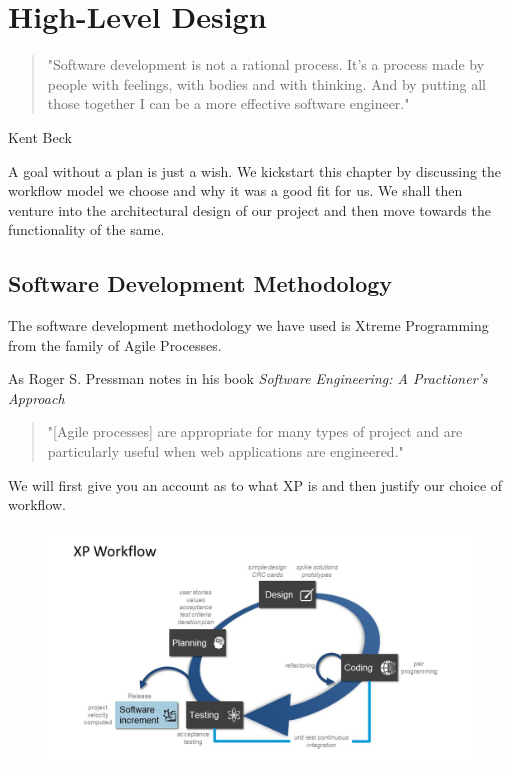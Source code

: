 \chapter{High-Level Design}

\begin{quotation}
"Software development is not a rational process. It's a process made by people with feelings,
with bodies and with thinking. And by putting all those together I can be a more effective
software engineer."
\end{quotation}
\begin{flushright}
Kent Beck
\end{flushright}

A goal without a plan is just a wish. We kickstart this chapter by discussing the workflow model we choose and why it was a good fit for us. We shall then venture into the architectural design of our project and then move towards the functionality of the same.


\section{Software Development Methodology}
The software development methodology we have used is Xtreme Programming from the family of Agile Processes.

As Roger S. Pressman notes in his book \textit{Software Engineering: A Practioner's Approach}

\begin{quotation}
"[Agile processes] are appropriate for many types of project and are particularly useful when web applications are engineered."
\end{quotation}

We will first give you an account as to what XP is and then justify our choice of workflow.

\begin{figure}
\includegraphics[scale=0.5]{images/xtreme.jpg}
\caption{}
\label{fig:xtreme}
\end{figure}

